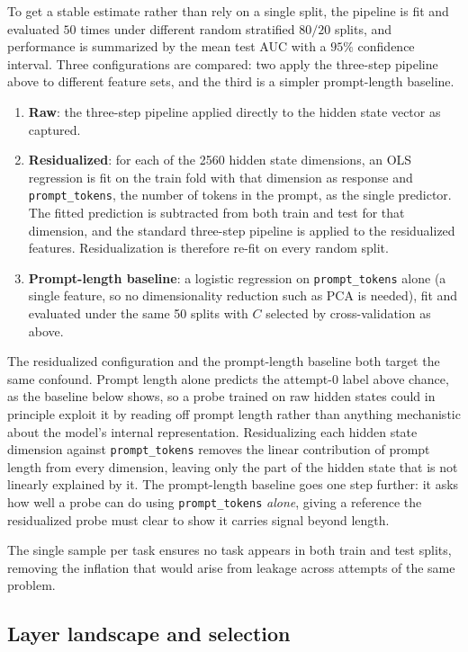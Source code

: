 To get a stable estimate rather than rely on a single split, the pipeline is fit and evaluated $50$ times under different random stratified $80/20$ splits, and performance is summarized by the mean test AUC with a $95\%$ confidence interval. Three configurations are compared: two apply the three-step pipeline above to different feature sets, and the third is a simpler prompt-length baseline.
\begin{enumerate}
    \item \textbf{Raw}: the three-step pipeline applied directly to the hidden state vector as captured.
    \item \textbf{Residualized}: for each of the 2560 hidden state dimensions, an OLS regression is fit on the train fold with that dimension as response and \texttt{prompt\_tokens}, the number of tokens in the prompt, as the single predictor. The fitted prediction is subtracted from both train and test for that dimension, and the standard three-step pipeline is applied to the residualized features. Residualization is therefore re-fit on every random split.
    \item \textbf{Prompt-length baseline}: a logistic regression on \texttt{prompt\_tokens} alone (a single feature, so no dimensionality reduction such as PCA is needed), fit and evaluated under the same 50 splits with $C$ selected by cross-validation as above.
\end{enumerate}

The residualized configuration and the prompt-length baseline both target the same confound. Prompt length alone predicts the attempt-0 label above chance, as the baseline below shows, so a probe trained on raw hidden states could in principle exploit it by reading off prompt length rather than anything mechanistic about the model's internal representation. Residualizing each hidden state dimension against \texttt{prompt\_tokens} removes the linear contribution of prompt length from every dimension, leaving only the part of the hidden state that is not linearly explained by it. The prompt-length baseline goes one step further: it asks how well a probe can do using \texttt{prompt\_tokens} \emph{alone}, giving a reference the residualized probe must clear to show it carries signal beyond length.

The single sample per task ensures no task appears in both train and test splits, removing the inflation that would arise from leakage across attempts of the same problem.

\subsection{Layer landscape and selection}
\label{subsec:layer_selection}

